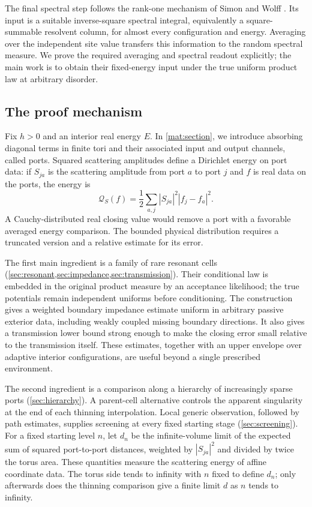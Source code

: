 The final spectral step follows the rank-one mechanism of Simon and
Wolff \cite{SimonWolff1986}. Its input is a suitable inverse-square
spectral integral, equivalently a square-summable resolvent column, for
almost every configuration and energy. Averaging over the independent
site value transfers this information to the random spectral measure.
We prove the required averaging and spectral readout explicitly; the
main work is to obtain their fixed-energy input under the true uniform
product law at arbitrary disorder.

\subsection*{The proof mechanism}
Fix $h>0$ and an interior real energy $E$. In \cref{mat:section}, we introduce absorbing
diagonal terms in finite tori and their associated input and output
channels, called ports. Squared scattering amplitudes define a
Dirichlet energy on port data: if $S_{ja}$ is the scattering amplitude
from port $a$ to port $j$ and $f$ is real data on the ports, the energy is
\[
 \mathcal Q_S(f)=\frac12\sum_{a,j}|S_{ja}|^2|f_j-f_a|^2.
\]
A Cauchy-distributed real closing value
would remove a port with a favorable averaged energy comparison. The
bounded physical distribution requires a truncated version and a
relative estimate for its error.

The first main ingredient is a family of rare resonant cells
(\cref{sec:resonant,sec:impedance,sec:transmission}). Their
conditional law is embedded in the original product measure by an
acceptance likelihood; the true potentials remain independent uniforms
before conditioning. The construction gives a weighted boundary
impedance estimate uniform in arbitrary passive exterior data, including
weakly coupled missing boundary directions. It also gives a transmission
lower bound strong enough to make the closing error small relative to
the transmission itself. These estimates, together with an upper
envelope over adaptive interior configurations, are useful beyond a
single prescribed environment.

The second ingredient is a comparison along a hierarchy of increasingly
sparse ports (\cref{sec:hierarchy}). A parent-cell alternative controls the apparent singularity
at the end of each thinning interpolation. Local generic observation,
followed by path estimates, supplies screening at every fixed starting
stage (\cref{sec:screening}). For a fixed starting level $n$, let $d_n$
be the infinite-volume limit of the expected sum of squared port-to-port
distances, weighted by $|S_{ja}|^2$ and divided by twice the torus area.
These quantities measure the scattering energy of affine coordinate
data. The torus side tends to infinity with $n$ fixed to define $d_n$;
only afterwards does the thinning comparison give a finite limit $d$
as $n$ tends to infinity.

